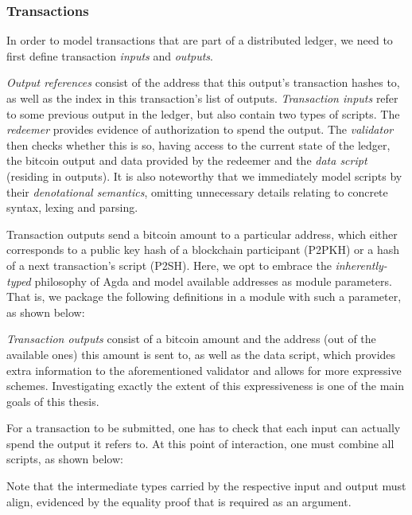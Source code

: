 \documentclass[acmsmall,nonacm=true,screen=true]{acmart}
\begin{document}
\UTXOhash{}

\subsubsection{Transactions}
In order to model transactions that are part of a distributed ledger, we need to first define transaction \textit{inputs} and
\textit{outputs}.

\UTXOinsOutRefs{}

\noindent
\textit{Output references} consist of the address that this output's transaction hashes to, 
as well as the index in this transaction's list of outputs.
\textit{Transaction inputs} refer to some previous output in the ledger, but also contain two types of scripts.
The \textit{redeemer} provides evidence of authorization to spend the output.
The \textit{validator} then checks whether this is so, having access to the current state of the ledger, the bitcoin output
and data provided by the redeemer and the \textit{data script} (residing in outputs).
It is also noteworthy that we immediately model scripts by their \textit{denotational semantics},
omitting unnecessary details relating to concrete syntax, lexing and parsing.

Transaction outputs send a bitcoin amount to a particular address, which either corresponds to a public key hash of a
blockchain participant (P2PKH) or a hash of a next transaction's script (P2SH).
Here, we opt to embrace the \textit{inherently-typed} philosophy of Agda and model available addresses as module parameters.
That is, we package the following definitions in a module with such a parameter, as shown below:

\UTXOoutTx{}

\noindent
\textit{Transaction outputs} consist of a bitcoin amount and the address (out of the available ones) this amount is sent to,
as well as the data script, which provides extra information to the aforementioned validator and allows for more expressive schemes.
Investigating exactly the extent of this expressiveness is one of the main goals of this thesis.

For a transaction to be submitted, one has to check that each input can actually spend the output it refers to.
At this point of interaction, one must combine all scripts, as shown below:

\UTXOrunValidation{}

\noindent
Note that the intermediate types carried by the respective input and output must align, evidenced by the
equality proof that is required as an argument.
\end{document}
